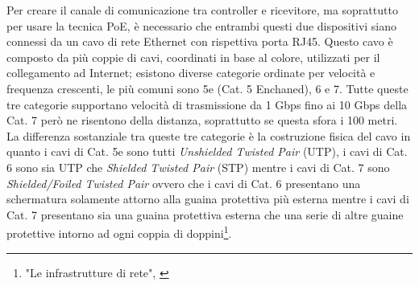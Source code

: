                     Per creare il canale di comunicazione tra controller e ricevitore, ma soprattutto per usare la tecnica PoE, è necessario che entrambi questi due dispositivi siano connessi da un cavo di rete Ethernet con rispettiva porta RJ45. Questo cavo è composto da più coppie di cavi, coordinati in base al colore, utilizzati per il collegamento ad Internet; esistono diverse categorie ordinate per velocità e frequenza crescenti, le più comuni sono 5e (Cat. 5 Enchaned), 6 e 7. Tutte queste tre categorie supportano velocità di trasmissione da 1 Gbps fino ai 10 Gbps della Cat. 7 però ne risentono della distanza, soprattutto se questa sfora i 100 metri. La differenza sostanziale tra queste tre categorie è la costruzione fisica del cavo in quanto i cavi di Cat. 5e sono tutti \textsl{Unshielded Twisted Pair} (UTP), i cavi di Cat. 6 sono sia UTP che \textsl{Shielded Twisted Pair} (STP) mentre i cavi di Cat. 7 sono \textsl{Shielded/Foiled Twisted Pair} ovvero che i cavi di Cat. 6 presentano una schermatura solamente attorno alla guaina protettiva più esterna mentre i cavi di Cat. 7 presentano sia una guaina protettiva esterna che una serie di altre guaine protettive intorno ad ogni coppia di doppini\footnote{"Le infrastrutture di rete", \cite{sciutoIntroduzioneAiSistemi2022}}. 
